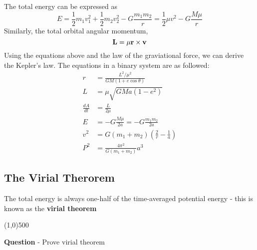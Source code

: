\documentclass{article}
\numberwithin{equation}{section}
\numberwithin{figure}{section}
\newcommand{\hr}{\begin{center} \line(1,0){500} \end{center}}
\begin{document}
	The total energy can be expressed as
	\begin{equation}
		E = \frac{1}{2}m_1v_1^2 + \frac{1}{2}m_2v_2^2 - G\frac{m_1m_2}{r} = \frac{1}{2}\mu v^2 - G\frac{M\mu}{r}
	\end{equation}
	Similarly, the total orbital angular momentum,
	\begin{equation}
		{\bf L} = \mu{\bf r}\times{\bf v}
	\end{equation}
	Using the equations above and the law of the graviational force, we can derive the Kepler's law. The equations in a binary system are as followed:
	\begin{align}
		r &= \frac{L^2/\mu^2}{GM(1+e\cos\theta)} \\
		L &= \mu\sqrt{GMa(1-e^2)} \\
		\frac{dA}{dt} &= \frac{L}{2\mu} \\
		E &= -G\frac{M\mu}{2a} = -G\frac{m_1m_2}{2a} \\
		v^2 &= G(m_1 + m_2)\left(\frac{2}{r}-\frac{1}{a}\right) \\
		P^2 &= \frac{4\pi^2}{G(m_1+m_2)}a^3
	\end{align}
	
	\subsection{The Virial Therorem}
	The total energy is always one-half of the time-averaged potential energy - this is known as the {\bf virial theorem}
	\hr {\bf Question} - Prove virial theorem
	
\end{document}
